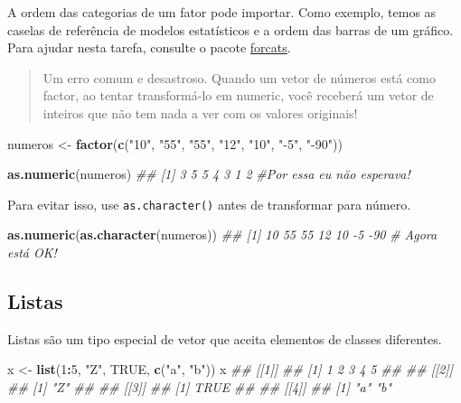 \documentclass[]{book}
\newenvironment{Shaded}{\begin{snugshade}}{\end{snugshade}}
\newcommand{\CommentTok}[1]{\textcolor[rgb]{0.56,0.35,0.01}{\textit{#1}}}
\newcommand{\DecValTok}[1]{\textcolor[rgb]{0.00,0.00,0.81}{#1}}
\newcommand{\KeywordTok}[1]{\textcolor[rgb]{0.13,0.29,0.53}{\textbf{#1}}}
\newcommand{\NormalTok}[1]{#1}
\newcommand{\OperatorTok}[1]{\textcolor[rgb]{0.81,0.36,0.00}{\textbf{#1}}}
\newcommand{\OtherTok}[1]{\textcolor[rgb]{0.56,0.35,0.01}{#1}}
\newcommand{\StringTok}[1]{\textcolor[rgb]{0.31,0.60,0.02}{#1}}
\begin{document}
A ordem das categorias de um fator pode importar. Como exemplo, temos as caselas de referência de modelos estatísticos e a ordem das barras de um gráfico. Para ajudar nesta tarefa, consulte o pacote \href{https://github.com/tidyverse/forcats}{forcats}.

\begin{quote}
Um erro comum e desastroso. Quando um vetor de números está como factor, ao tentar transformá-lo em numeric, você receberá um vetor de inteiros que não tem nada a ver com os valores originais!
\end{quote}

\begin{Shaded}
\begin{Highlighting}[]
\NormalTok{numeros <-}\StringTok{ }\KeywordTok{factor}\NormalTok{(}\KeywordTok{c}\NormalTok{(}\StringTok{"10"}\NormalTok{, }\StringTok{"55"}\NormalTok{, }\StringTok{"55"}\NormalTok{, }\StringTok{"12"}\NormalTok{, }\StringTok{"10"}\NormalTok{, }\StringTok{"-5"}\NormalTok{, }\StringTok{"-90"}\NormalTok{))}

\KeywordTok{as.numeric}\NormalTok{(numeros)}
\CommentTok{## [1] 3 5 5 4 3 1 2}
\CommentTok{#Por essa eu năo esperava!}
\end{Highlighting}
\end{Shaded}

Para evitar isso, use \texttt{as.character()} antes de transformar para número.

\begin{Shaded}
\begin{Highlighting}[]
\KeywordTok{as.numeric}\NormalTok{(}\KeywordTok{as.character}\NormalTok{(numeros))}
\CommentTok{## [1]  10  55  55  12  10  -5 -90}
\CommentTok{# Agora está OK!}
\end{Highlighting}
\end{Shaded}

\hypertarget{listas}{%
\subsection{Listas}\label{listas}}

Listas são um tipo especial de vetor que aceita elementos de classes diferentes.

\begin{Shaded}
\begin{Highlighting}[]
\NormalTok{x <-}\StringTok{ }\KeywordTok{list}\NormalTok{(}\DecValTok{1}\OperatorTok{:}\DecValTok{5}\NormalTok{, }\StringTok{"Z"}\NormalTok{, }\OtherTok{TRUE}\NormalTok{, }\KeywordTok{c}\NormalTok{(}\StringTok{"a"}\NormalTok{, }\StringTok{"b"}\NormalTok{))}
\NormalTok{x}
\CommentTok{## [[1]]}
\CommentTok{## [1] 1 2 3 4 5}
\CommentTok{## }
\CommentTok{## [[2]]}
\CommentTok{## [1] "Z"}
\CommentTok{## }
\CommentTok{## [[3]]}
\CommentTok{## [1] TRUE}
\CommentTok{## }
\CommentTok{## [[4]]}
\CommentTok{## [1] "a" "b"}
\end{Highlighting}
\end{Shaded}
\end{document}
